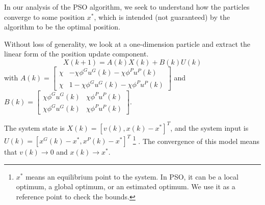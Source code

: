 In our analysis of the PSO algorithm, we seek to understand how the particles converge to some position $ x^{*} $, which is intended (not guaranteed) by the algorithm to be the optimal position.

Without loss of generality, we look at a one-dimension particle and extract the linear form of the position update component.
\begin{equation}
\label{eq:pso_up_linalg_simp}
X(k+1) = A(k) X(k) + B(k) U(k)
\end{equation}
with
$ A(k) = \begin{bmatrix}
\chi & - \chi \phi^{G} u^{G}(k) - \chi \phi^{P} u^{P}(k)
\\ 
\chi & 1 - \chi \phi^{G} u^{G}(k) - \chi \phi^{P} u^{P}(k)
\end{bmatrix} $
and
$ B(k) = \begin{bmatrix}
\chi \phi^{G} u^{G}(k) & \chi \phi^{P} u^{P}(k)
\\ 
\chi \phi^{G} u^{G}(k) & \chi \phi^{P} u^{P}(k)
\end{bmatrix} $.

The system state is $ X(k) = [ v(k), x(k) - x^{*} ]^{T} $, and the system input is $ U(k) = [ x^{G}(k) - x^{*} , x^{P}(k) - x^{*} ]^{T} $
\footnote{$ x^{*} $ means an equilibrium point to the system.
In PSO, it can be a local optimum, a global optimum, or an estimated optimum.
We use it as a reference point to check the bounds.}
.
The convergence of this model means that $ v(k) \rightarrow 0 $ and $ x(k) \rightarrow x^{*} $.

